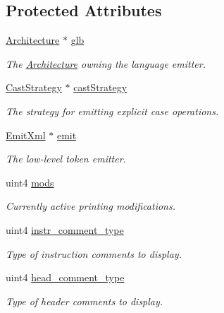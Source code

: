 \subsection*{Protected Attributes}
\begin{DoxyCompactItemize}
\item 
\mbox{\hyperlink{class_architecture}{Architecture}} $\ast$ \mbox{\hyperlink{class_print_language_a0100461bfbb13d149ce623cb0a82e99f}{glb}}
\begin{DoxyCompactList}\small\item\em The \mbox{\hyperlink{class_architecture}{Architecture}} owning the language emitter. \end{DoxyCompactList}\item 
\mbox{\hyperlink{class_cast_strategy}{Cast\+Strategy}} $\ast$ \mbox{\hyperlink{class_print_language_abb49ca98bdc4f3d655362031987ab6db}{cast\+Strategy}}
\begin{DoxyCompactList}\small\item\em The strategy for emitting explicit {\itshape case} operations. \end{DoxyCompactList}\item 
\mbox{\hyperlink{class_emit_xml}{Emit\+Xml}} $\ast$ \mbox{\hyperlink{class_print_language_a448d008089a47944ef6b07b4892faa7f}{emit}}
\begin{DoxyCompactList}\small\item\em The low-\/level token emitter. \end{DoxyCompactList}\item 
uint4 \mbox{\hyperlink{class_print_language_a9c87a425ce241ce1b47ca8305de2fdc0}{mods}}
\begin{DoxyCompactList}\small\item\em Currently active printing modifications. \end{DoxyCompactList}\item 
uint4 \mbox{\hyperlink{class_print_language_a4bb9049299d4bf3932bb5422a1706a66}{instr\+\_\+comment\+\_\+type}}
\begin{DoxyCompactList}\small\item\em Type of instruction comments to display. \end{DoxyCompactList}\item 
uint4 \mbox{\hyperlink{class_print_language_ad1857510f16a26544c2c8a23b9a86a22}{head\+\_\+comment\+\_\+type}}
\begin{DoxyCompactList}\small\item\em Type of header comments to display. \end{DoxyCompactList}\end{DoxyCompactItemize}


